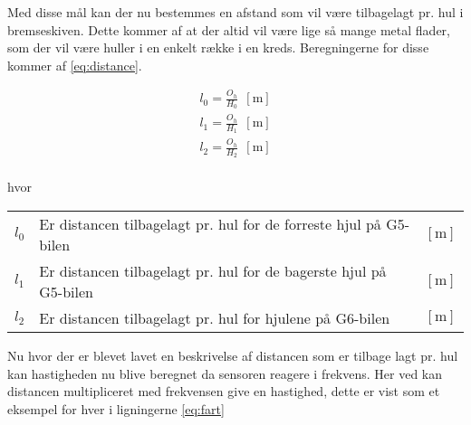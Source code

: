 \documentclass[12pt,a4paper]{report}
\begin{document}
Med disse mål kan der nu bestemmes en afstand som vil være tilbagelagt pr. hul i bremseskiven. Dette kommer af at der altid vil være lige så mange metal flader, som der vil være huller i en enkelt række i en kreds. Beregningerne for disse kommer af \ref{eq:distance}.

\begin{center}
	\begin{subequations} \label{eq:distance}
		\begin{align}
l_{0} = \frac{O_{h}}{H_{0}} ~~ \left[\text{m}\right] \\
l_{1} = \frac{O_{h}}{H_{1}} ~~ \left[\text{m}\right] \\
l_{2} = \frac{O_{h}}{H_{2}} ~~ \left[\text{m}\right] \\
		\end{align}	
	\end{subequations}
\end{center}
hvor
\begin{center}
	\begin{tabular}{ l l l }
	  $l_{0}$ & Er distancen tilbagelagt pr. hul for de forreste hjul på G5-bilen & $\left[\text{m}\right]$ \\
	  $l_{1}$ & Er distancen tilbagelagt pr. hul for de bagerste hjul på G5-bilen & $\left[\text{m}\right]$\\
	  $l_{2}$ & Er distancen tilbagelagt pr. hul for hjulene på G6-bilen & $\left[\text{m}\right]$ \\
	\end{tabular}  
\end{center}

Nu hvor der er blevet lavet en beskrivelse af distancen som er tilbage lagt pr. hul kan hastigheden nu blive beregnet da sensoren reagere i frekvens. Her ved kan distancen multipliceret med frekvensen give en hastighed, dette er vist som et eksempel for hver i ligningerne \ref{eq:fart}
\end{document}
